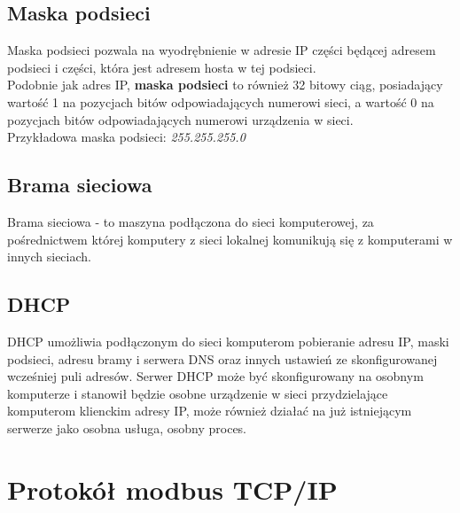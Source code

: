 \documentclass[12pt]{article}
\begin{document}
\subsection{Maska podsieci}
Maska podsieci pozwala na wyodrębnienie w adresie IP części będącej adresem podsieci i części, która jest adresem hosta w tej podsieci.\\
Podobnie jak adres IP, \textbf{maska podsieci} to również 32 bitowy ciąg, posiadający wartość 1 na pozycjach bitów odpowiadających numerowi sieci, a wartość 0 na pozycjach bitów odpowiadających numerowi urządzenia w sieci.\\
Przykładowa maska podsieci: \textit{255.255.255.0}
\subsection{Brama sieciowa}
Brama sieciowa - to maszyna podłączona do sieci komputerowej, za pośrednictwem której komputery z sieci lokalnej komunikują się z komputerami w innych sieciach.
\subsection{DHCP}
DHCP umożliwia podłączonym do sieci komputerom pobieranie adresu IP, maski podsieci, adresu bramy i serwera DNS oraz innych ustawień ze skonfigurowanej wcześniej puli adresów. Serwer DHCP może być skonfigurowany na osobnym komputerze i stanowił będzie osobne urządzenie w sieci przydzielające komputerom klienckim adresy IP, może również działać na już istniejącym serwerze jako osobna usługa, osobny proces.
\section{Protokół modbus TCP/IP}
\end{document}
